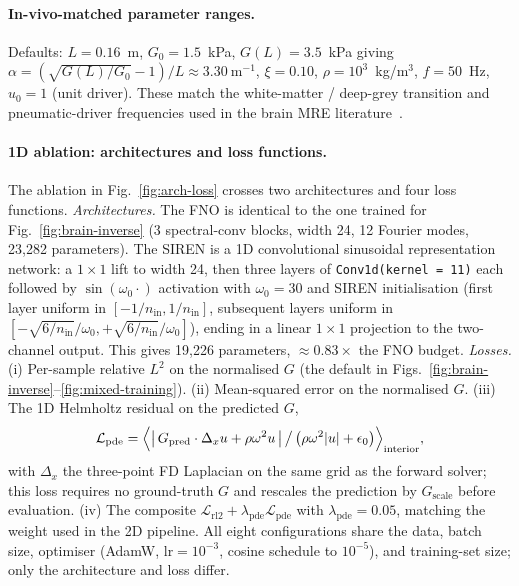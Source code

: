 \documentclass[11pt,letterpaper]{article}
\begin{document}
\paragraph{In-vivo-matched parameter ranges.}
\label{sec:methods-1d-params}
Defaults: $L=0.16$~m, $G_{0}=1.5$~kPa, $G(L)=3.5$~kPa giving
$\alpha = (\sqrt{G(L)/G_{0}}-1)/L \approx 3.30~\mathrm{m^{-1}}$,
$\xi=0.10$, $\rho=10^{3}$~kg/m$^{3}$, $f=50$~Hz, $u_{0}=1$ (unit driver).
These match the white-matter / deep-grey transition and pneumatic-driver
frequencies used in the brain MRE
literature~\cite{murphy2024lowfreq,herasrivera2025onli}.

\paragraph{1D ablation: architectures and loss functions.}
\label{sec:methods-1d-ablation}
The ablation in Fig.~\ref{fig:arch-loss} crosses two architectures and
four loss functions. \emph{Architectures.} The FNO is identical to the
one trained for Fig.~\ref{fig:brain-inverse} (3 spectral-conv blocks,
width 24, 12 Fourier modes, 23{,}282 parameters). The SIREN is a 1D
convolutional sinusoidal representation network: a $1\!\times\!1$ lift
to width 24, then three layers of \texttt{Conv1d(kernel\,=\,11)} each
followed by $\sin(\omega_{0}\cdot)$ activation with $\omega_{0}=30$ and
SIREN initialisation (first layer uniform in
$[-1/n_{\text{in}},1/n_{\text{in}}]$, subsequent layers uniform in
$[-\sqrt{6/n_{\text{in}}}/\omega_{0},+\sqrt{6/n_{\text{in}}}/\omega_{0}]$),
ending in a linear $1\!\times\!1$ projection to the two-channel output.
This gives 19{,}226 parameters, $\approx 0.83\times$ the FNO budget.
\emph{Losses.} (i) Per-sample relative $L^{2}$ on the normalised $G$
(the default in Figs.~\ref{fig:brain-inverse}--\ref{fig:mixed-training}).
(ii) Mean-squared error on the normalised $G$. (iii) The 1D Helmholtz
residual on the predicted $G$,
\[
\mathcal{L}_{\mathrm{pde}}=
\Bigl\langle\bigl|\,G_{\mathrm{pred}}\cdot\Delta_{x}u
       + \rho\omega^{2}u\,\bigr|\,\big/\,
\bigl(\rho\omega^{2}|u|+\epsilon_{0}\bigr)\Bigr\rangle_{\text{interior}},
\]
with $\Delta_{x}$ the three-point FD Laplacian on the same grid as the
forward solver; this loss requires no ground-truth $G$ and rescales the
prediction by $G_{\text{scale}}$ before evaluation. (iv) The composite
$\mathcal{L}_{\mathrm{rl2}}+\lambda_{\mathrm{pde}}\mathcal{L}_{\mathrm{pde}}$
with $\lambda_{\mathrm{pde}}=0.05$, matching the weight used in the 2D
pipeline. All eight configurations share the data, batch size, optimiser
(AdamW, $\mathrm{lr}=10^{-3}$, cosine schedule to $10^{-5}$), and
training-set size; only the architecture and loss differ.
\end{document}
